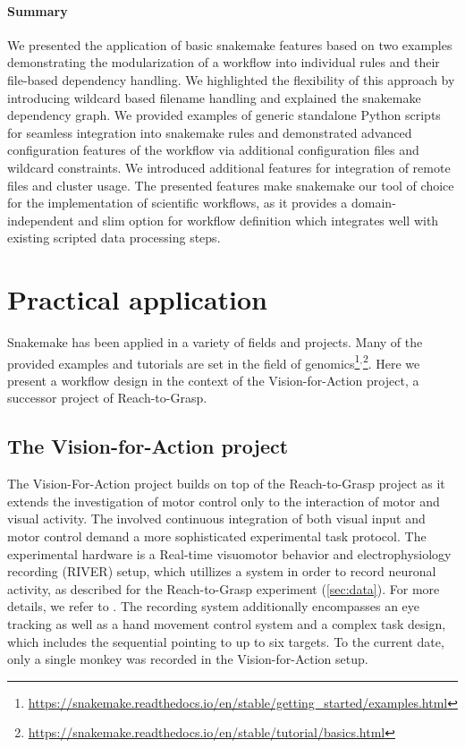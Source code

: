 \paragraph{Summary}
We presented the application of basic snakemake features based on two examples demonstrating the modularization of a workflow into individual rules and their file-based dependency handling. We highlighted the flexibility of this approach by introducing wildcard based filename handling and explained the snakemake dependency graph. We provided examples of generic standalone Python scripts for seamless integration into snakemake rules and demonstrated advanced configuration features of the workflow via additional configuration files and wildcard constraints. We introduced additional features for integration of remote files and cluster usage.
The presented features make snakemake our tool of choice for the implementation of scientific workflows, as it provides a domain-independent and slim option for workflow definition which integrates well with existing scripted data processing steps.


\section{Practical application}
Snakemake has been applied in a variety of fields and projects. Many of the provided examples and tutorials are set in the field of genomics\footnote{\url{https://snakemake.readthedocs.io/en/stable/getting_started/examples.html}}$^,$\footnote{\url{https://snakemake.readthedocs.io/en/stable/tutorial/basics.html}}. Here we present a workflow design in the context of the Vision-for-Action project, a successor project of Reach-to-Grasp.

\subsection{The Vision-for-Action project}
The Vision-For-Action project builds on top of the Reach-to-Grasp project as it extends the investigation of motor control only to the interaction of motor and visual activity. The involved continuous integration of both visual input and motor control demand a more sophisticated experimental task protocol. The experimental hardware is a Real-time visuomotor behavior and electrophysiology recording (RIVER) setup, which utillizes a  system in order to record neuronal activity, as described for the Reach-to-Grasp experiment (\cref{sec:data}). For more details, we refer to \citet{deHaan_2018,deHaan_2018a}. The recording system additionally encompasses an eye tracking as well as a hand movement control system and a complex task design, which includes the sequential pointing to up to six targets. To the current date, only a single monkey was recorded in the Vision-for-Action setup.

